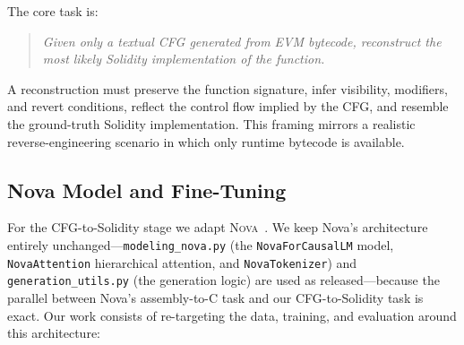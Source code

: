 \documentclass{stylefiles/capstone}
\begin{document}
The core task is:

\begin{quote}
\textit{Given only a textual CFG generated from EVM bytecode, reconstruct the most
likely Solidity implementation of the function.}
\end{quote}

A reconstruction must preserve the function signature, infer visibility, modifiers,
and revert conditions, reflect the control flow implied by the CFG, and resemble
the ground-truth Solidity implementation. This framing mirrors a realistic
reverse-engineering scenario in which only runtime bytecode is available.

\subsection{Nova Model and Fine-Tuning}
\label{sec:nova}

For the CFG-to-Solidity stage we adapt \textsc{Nova}~\cite{jiang2025nova}. We keep
Nova's architecture entirely unchanged—\texttt{modeling\_nova.py} (the
\texttt{NovaForCausalLM} model, \texttt{NovaAttention} hierarchical attention, and
\texttt{NovaTokenizer}) and \texttt{generation\_utils.py} (the generation logic)
are used as released—because the parallel between Nova's assembly-to-C task and our
CFG-to-Solidity task is exact. Our work consists of re-targeting the data,
training, and evaluation around this architecture:
\end{document}
